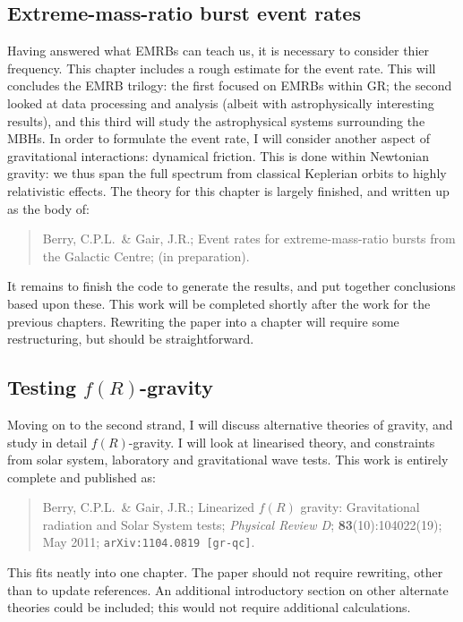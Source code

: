 \documentclass[a4paper, 11pt, twoside]{article}
\begin{document}
\subsection{Extreme-mass-ratio burst event rates}

Having answered what EMRBs can teach us, it is necessary to consider thier frequency. This chapter includes a rough estimate for the event rate. This will concludes the EMRB trilogy: the first focused on EMRBs within GR; the second looked at data processing and analysis (albeit with astrophysically interesting results), and this third will study the astrophysical systems surrounding the MBHs. In order to formulate the event rate, I will consider another aspect of gravitational interactions: dynamical friction. This is done within Newtonian gravity: we thus span the full spectrum from classical Keplerian orbits to highly relativistic effects. The theory for this chapter is largely finished, and written up as the body of:
\begin{quote}
Berry, C.P.L.\ \& Gair, J.R.; Event rates for extreme-mass-ratio bursts from the Galactic Centre; (in preparation).
\end{quote}
It remains to finish the code to generate the results, and put together conclusions based upon these. This work will be completed shortly after the work for the previous chapters. Rewriting the paper into a chapter will require some restructuring, but should be straightforward.

\subsection{Testing $f(R)$-gravity}

Moving on to the second strand, I will discuss alternative theories of gravity, and study in detail $f(R)$-gravity. I will look at linearised theory, and constraints from solar system, laboratory and gravitational wave tests. This work is entirely complete and published as:
\begin{quote}
Berry, C.P.L.\ \& Gair, J.R.; Linearized $f(R)$ gravity: Gravitational radiation and Solar System tests; {\it Physical Review D}; {\bf 83}(10):104022(19); May 2011; {\tt arXiv:1104.0819 [gr-qc]}.
\end{quote}
This fits neatly into one chapter. The paper should not require rewriting, other than to update references. An additional introductory section on other alternate theories could be included; this would not require additional calculations.
\end{document}
